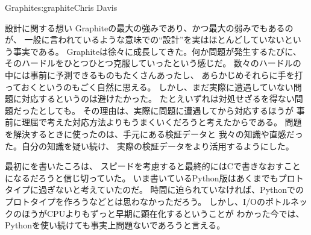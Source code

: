 \begin{aosachapter}{Graphite}{s:graphite}{Chris Davis}
\begin{aosasect1}{設計に関する想い}
Graphiteの最大の強みであり、かつ最大の弱みでもあるのが、
一般に言われているような意味での``設計''を実はほとんどしていないという事実である。
Graphiteは徐々に成長してきた。何か問題が発生するたびに、
そのハードルをひとつひとつ克服していったという感じだ。
数々のハードルの中には事前に予測できるものもたくさんあったし、
あらかじめそれらに手を打っておくというのもごく自然に思える。
しかし、まだ実際に遭遇していない問題に対応するというのは避けたかった。
たとえいずれは対処せざるを得ない問題だったとしても。
その理由は、実際に問題に遭遇してから対応するほうが
事前に理屈で考えた対応方法よりもうまくいくだろうと考えたからである。
問題を解決するときに使ったのは、手元にある検証データと
我々の知識や直感だった。自分の知識を疑い続け、
実際の検証データをより活用するようにした。

最初にを書いたころは、
スピードを考慮すると最終的にはCで書きなおすことになるだろうと信じ切っていた。
いま書いているPython版はあくまでもプロトタイプに過ぎないと考えていたのだ。
時間に迫られていなければ、Pythonでのプロトタイプを作ろうなどとは思わなかっただろう。
しかし、I/OのボトルネックのほうがCPUよりもずっと早期に顕在化するということが
わかった今では、Pythonを使い続けても事実上問題ないであろうと言える。


\end{aosasect1}
\end{aosachapter}
